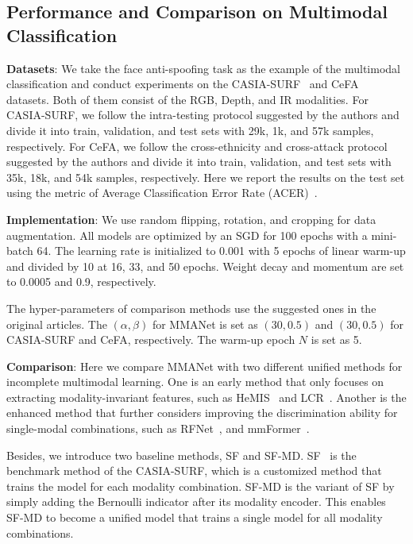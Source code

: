 \documentclass[10pt,twocolumn,letterpaper]{article}
\begin{document}
\subsection{Performance and Comparison on Multimodal Classification}

\textbf{Datasets}: We take the face anti-spoofing task as the example of the multimodal classification and conduct experiments on the CASIA-SURF~\cite{surf} and CeFA~\cite{cefa} datasets. Both of them consist of the RGB, Depth, and IR modalities. For CASIA-SURF, we follow the intra-testing protocol suggested by the authors and divide it into train, validation, and test sets with 29k, 1k, and 57k samples, respectively. For CeFA, we follow the cross-ethnicity and cross-attack protocol suggested by the authors and divide it into train, validation, and test sets with 35k, 18k, and 54k samples, respectively. Here we report the results on the test set using the metric of Average Classification Error Rate (ACER)~\cite{surf}.



\textbf{Implementation}: We use random flipping, rotation, and cropping for data augmentation. All models are optimized by an SGD for 100 epochs with a mini-batch 64. The learning rate is initialized to 0.001 with 5 epochs of linear warm-up and divided by 10 at 16, 33, and 50 epochs. Weight decay and momentum are set to 0.0005 and 0.9, respectively.

The hyper-parameters of comparison methods use the suggested ones in the original articles. The $(\alpha,\beta)$ for MMANet is set as $(30,0.5)$ and $(30,0.5)$ for CASIA-SURF and CeFA, respectively. The warm-up epoch $N$ is set as 5.

\textbf{Comparison}: Here we compare MMANet with two different unified methods for incomplete multimodal learning. One is an early method that only focuses on extracting modality-invariant features, such as HeMIS~\cite{hemis} and LCR~\cite{lcr}. Another is the enhanced method that further considers improving the discrimination ability for single-modal combinations, such as RFNet~\cite{rfnet}, and mmFormer~\cite{mmformer}. 

Besides, we introduce two baseline methods, SF and SF-MD. SF~\cite{surf} is the benchmark method of the CASIA-SURF, which is a customized method that trains the model for each modality combination. SF-MD is the variant of SF by simply adding the Bernoulli indicator after its modality encoder. This enables SF-MD to become a unified model that trains a single model for all modality combinations.
\end{document}
